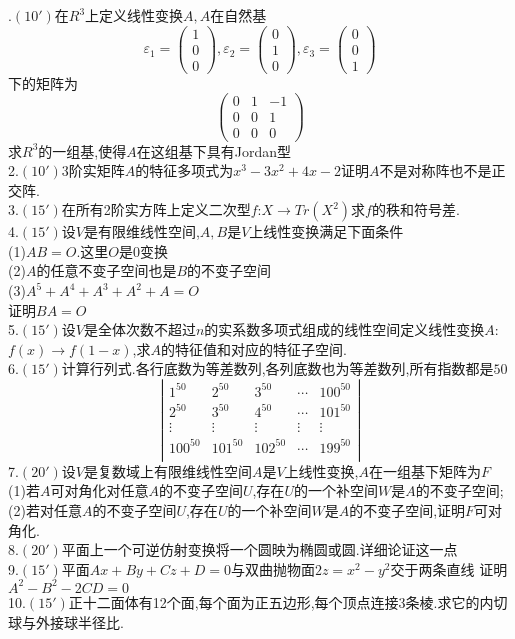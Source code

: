 \documentclass[b5paper]{ctexart}
\begin{document}
\pagestyle{plain}
.$(10')$在$R^3$上定义线性变换$A,A$在自然基
\[\varepsilon_1=\left(\begin{array}{c}
1\\
0\\
0\end{array}\right),\varepsilon_2=\left(\begin{array}{c}
0\\
1\\
0\end{array}\right),\varepsilon_3=\left(\begin{array}{c}
0\\
0\\
1\end{array}\right)\]下的矩阵为
\[\left(\begin{array}{ccc}
0& 1& -1\\
0& 0& 1\\
0& 0& 0\end{array}\right)\]
求$R^3$的一组基,使得$A$在这组基下具有Jordan型\\
2.$(10')$3阶实矩阵$A$的特征多项式为$x^3-3x^2+4x-2$证明$A$不是对称阵也不是正交阵.\\
3.$(15')$在所有2阶实方阵上定义二次型$f$:$X\rightarrow Tr(X^2)$求$f$的秩和符号差.\\
4.$(15')$设$V$是有限维线性空间,$A,B$是$V$上线性变换满足下面条件\\
(1)$AB=O$.这里$O$是0变换\\
(2)$A$的任意不变子空间也是$B$的不变子空间\\
(3)$A^5+A^4+A^3+A^2+A=O$\\
证明$BA=O$\\
5.$(15')$设$V$是全体次数不超过$n$的实系数多项式组成的线性空间定义线性变换$A$:$f(x)\rightarrow f(1-x)$,求$A$的特征值和对应的特征子空间.\\
6.$(15')$计算行列式.各行底数为等差数列,各列底数也为等差数列,所有指数都是$50$
\[\left|\begin{array}{ccccc}
1^{50}& 2^{50}& 3^{50}& \cdots & 100^{50}\\
2^{50}& 3^{50}& 4^{50}&　\cdots & 101^{50}\\
\vdots& \vdots&\vdots&\vdots& \vdots\\
100^{50}& 101^{50}& 102^{50}& \cdots& 199^{50}\\\end{array}\right|\]
7.$(20')$设$V$是复数域上有限维线性空间$A$是$V$上线性变换,$A$在一组基下矩阵为$F$\\
(1)若$A$可对角化对任意$A$的不变子空间$U$,存在$U$的一个补空间$W$是$A$的不变子空间;\\
(2)若对任意$A$的不变子空间$U$,存在$U$的一个补空间$W$是$A$的不变子空间,证明$F$可对角化.\\
8.$(20')$平面上一个可逆仿射变换将一个圆映为椭圆或圆.详细论证这一点\\
9.$(15')$平面$Ax+By+Cz+D=0$与双曲抛物面$2z=x^2-y^2$交于两条直线
证明$A^2-B^2-2CD=0$\\
10.$(15')$正十二面体有12个面,每个面为正五边形,每个顶点连接3条棱.求它的内切球与外接球半径比.\\
\end{document}
